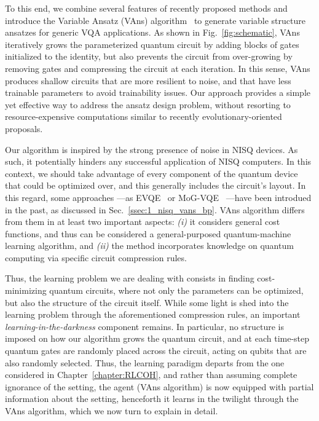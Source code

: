 \afterpage{\clearpage}

To this end, we combine several features of recently proposed methods and introduce the Variable Ansatz (VAns) algorithm~\cite{bilkis2021semi} to generate variable structure ansatzes for generic VQA applications. As shown in Fig.~\ref{fig:schematic}, VAns iteratively grows the parameterized quantum circuit by adding blocks of gates initialized to the identity, but also prevents the circuit from over-growing by removing gates and compressing the circuit at each iteration. In this sense, VAns produces shallow circuits that are more resilient to noise, and that have less trainable parameters to avoid trainability issues. Our approach provides a simple yet effective way to address the ansatz design problem, without resorting to resource-expensive computations similar to recently evolutionary-oriented proposals.

Our algorithm is inspired by the strong presence of noise in NISQ devices. As such, it potentially hinders any successful application of NISQ computers. In this context, we should take advantage of every component of the quantum device that could be optimized over, and this generally includes the circuit's layout. In this regard, some approaches ---as EVQE~\cite{rattew2019domain} or MoG-VQE~\cite{chivilikhin2020mog} ---have been introdued in the past, as discussed in Sec.~\ref{ssec:1_nisq_vans_bp}. VAns algorithm differs from them in at least two important aspects: \textit{(i)} it considers general cost functions, and thus can be considered a general-purposed quantum-machine learning algorithm, and \textit{(ii)} the method incorporates knowledge on quantum computing via specific circuit compression rules.

Thus, the learning problem we are dealing with consists in finding cost-minimizing quantum circuits, where not only the parameters can be optimized, but also the structure of the circuit itself. While some light is shed into the learning problem through the aforementioned compression rules, an important \textit{learning-in-the-darkness} component remains. In particular, no structure is imposed on how our algorithm grows the quantum circuit, and at each time-step quantum gates are randomly placed across the circuit, acting on qubits that are also randomly selected. Thus, the learning paradigm departs from the one considered in Chapter~\ref{chapter:RLCOH}, and rather than assuming complete ignorance of the setting, the agent (VAns algorithm) is now equipped with partial information about the setting, henceforth it learns in the twilight through the VAns algorithm, which we now turn to explain in detail.
